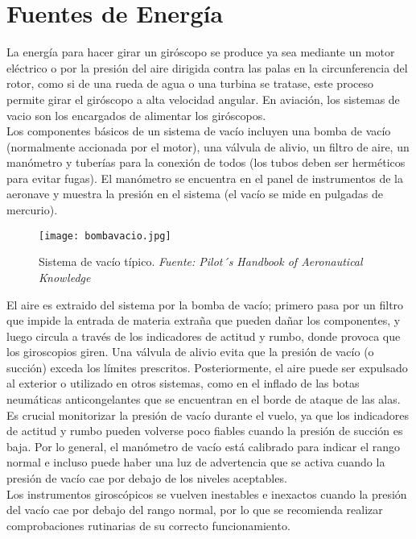 \section{Fuentes de Energía}
La energía para hacer girar un giróscopo se produce ya sea mediante un motor eléctrico o por la presión del aire dirigida contra las palas en la circunferencia del rotor, como si de una rueda de agua o una turbina se tratase, este proceso permite girar el giróscopo a alta velocidad angular. En aviación, los sistemas de vacio son los encargados de alimentar los giróscopos.\\  

Los componentes básicos de un sistema de vacío incluyen una bomba de vacío (normalmente accionada por el motor), una válvula de alivio, un filtro de aire, un manómetro y tuberías para la conexión de todos (los tubos deben ser herméticos para evitar fugas). El manómetro se encuentra en el panel de instrumentos de la aeronave y muestra la presión en el sistema (el vacío se mide en pulgadas de mercurio).

\begin{figure}[H]
    \centering
    \texttt{[image: bombavacio.jpg]}
    \caption{\centering Sistema de vacío típico. \textit{ Fuente: Pilot´s Handbook of Aeronautical Knowledge}}
    \label{fig:placeholderbombavacio}
\end{figure}

El aire es extraido del sistema por la bomba de vacío; primero pasa por un filtro que impide la entrada de materia extraña que pueden dañar los componentes, y luego circula a través de los indicadores de actitud y rumbo, donde provoca que los giroscopios giren. Una válvula de alivio evita que la presión de vacío (o succión) exceda los límites prescritos. Posteriormente, el aire puede ser expulsado al exterior o utilizado en otros sistemas, como en el inflado de las botas neumáticas anticongelantes que se encuentran en el borde de ataque de las alas.\\ 

Es crucial monitorizar la presión de vacío durante el vuelo, ya que los indicadores de actitud y rumbo pueden volverse poco fiables cuando la presión de succión es baja. Por lo general, el manómetro de vacío está calibrado para indicar el rango normal e incluso puede haber una luz de advertencia que se activa cuando la presión de vacío cae por debajo de los niveles aceptables.\\

Los instrumentos giroscópicos se vuelven inestables e inexactos cuando la presión del vacío cae por debajo del rango normal, por lo que se recomienda realizar comprobaciones rutinarias de su correcto funcionamiento.\\


